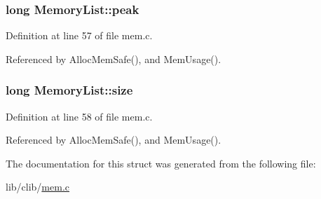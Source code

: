 \subsubsection[{\texorpdfstring{peak}{peak}}]{\setlength{\rightskip}{0pt plus 5cm}long Memory\+List\+::peak}\hypertarget{structMemoryList_af2065db30ea83a216adb77fbdb59e1e4}{}\label{structMemoryList_af2065db30ea83a216adb77fbdb59e1e4}


Definition at line 57 of file mem.\+c.



Referenced by Alloc\+Mem\+Safe(), and Mem\+Usage().

\subsubsection[{\texorpdfstring{size}{size}}]{\setlength{\rightskip}{0pt plus 5cm}long Memory\+List\+::size}\hypertarget{structMemoryList_ac481474722f97086e8316d62502c4881}{}\label{structMemoryList_ac481474722f97086e8316d62502c4881}


Definition at line 58 of file mem.\+c.



Referenced by Alloc\+Mem\+Safe(), and Mem\+Usage().



The documentation for this struct was generated from the following file\+:\begin{DoxyCompactItemize}
\item 
lib/clib/\hyperlink{mem_8c}{mem.\+c}\end{DoxyCompactItemize}
